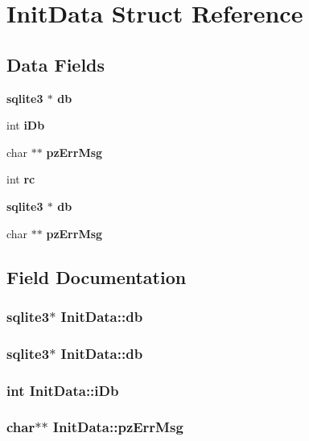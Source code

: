 \section{Init\-Data Struct Reference}
\label{structInitData}
\subsection*{Data Fields}
\begin{CompactItemize}
\item 
\bf{sqlite3} $\ast$ \bf{db}
\item 
int \bf{i\-Db}
\item 
char $\ast$$\ast$ \bf{pz\-Err\-Msg}
\item 
int \bf{rc}
\item 
\bf{sqlite3} $\ast$ \bf{db}
\item 
char $\ast$$\ast$ \bf{pz\-Err\-Msg}
\end{CompactItemize}


\subsection{Field Documentation}
\subsubsection{\setlength{\rightskip}{0pt plus 5cm}\bf{sqlite3}$\ast$ \bf{Init\-Data::db}}\label{structInitData_2c9569c27238747c7cd1afa5263d289f}


\subsubsection{\setlength{\rightskip}{0pt plus 5cm}\bf{sqlite3}$\ast$ \bf{Init\-Data::db}}\label{structInitData_2c9569c27238747c7cd1afa5263d289f}


\subsubsection{\setlength{\rightskip}{0pt plus 5cm}int \bf{Init\-Data::i\-Db}}\label{structInitData_1703248ba393eace2631098499f3908b}


\subsubsection{\setlength{\rightskip}{0pt plus 5cm}char$\ast$$\ast$ \bf{Init\-Data::pz\-Err\-Msg}}\label{structInitData_a8edf4b6f8fd4b3b8e2b3ae5a00dd25f}


